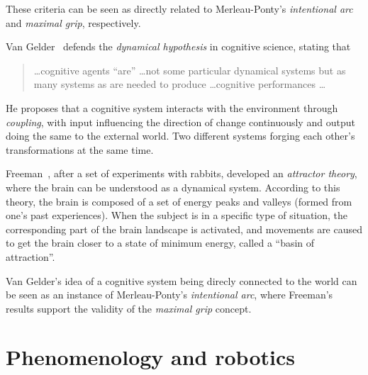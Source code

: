 \documentclass{article}
\begin{document}
These criteria can be seen as directly related to Merleau-Ponty's
\emph{intentional arc} and \emph{maximal grip}, respectively.


Van Gelder~\cite{vangelder1998} defends the \emph{dynamical hypothesis} in
cognitive science, stating that

\begin{quotation}
  \dots cognitive agents ``are'' \dots not some particular dynamical systems but
  as many systems as are needed to produce \dots cognitive performances \dots
\end{quotation}

He proposes that a cognitive system interacts with the environment through
\emph{coupling}, with input influencing the direction of change continuously and
output doing the same to the external world. Two different systems forging each
other's transformations at the same time.

Freeman~\cite{freeman1991}, after a set of experiments with rabbits, developed
an \emph{attractor theory}, where the brain can be understood as a dynamical 
system. According to this theory, the brain is composed of a set of energy peaks
and valleys (formed from one's past experiences). When the subject is in a
specific type of situation, the corresponding part of the brain landscape is
activated, and movements are caused to get the brain closer to a state of
minimum energy, called a ``basin of attraction''.

Van Gelder's idea of a cognitive system being direcly connected to the world can
be seen as an instance of Merleau-Ponty's \emph{intentional arc}, where
Freeman's results support the validity of the \emph{maximal grip} concept.


\section{Phenomenology and robotics}
\end{document}
